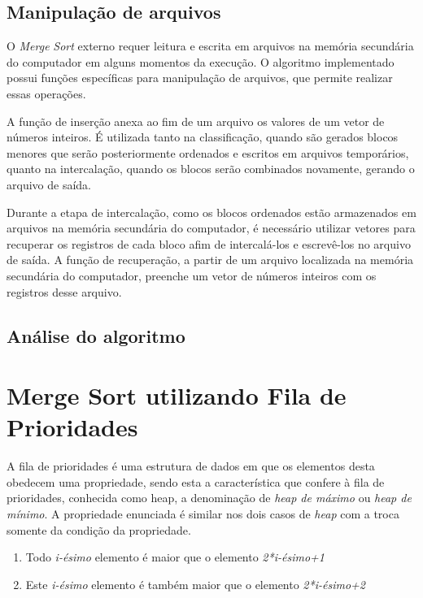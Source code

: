 \documentclass[a4paper, 12pt]{report}
\begin{document}
\chapter{Manipulação de arquivos}
\label{sec-2-2}

O \emph{Merge} \emph{Sort} externo requer leitura e escrita em arquivos na memória secundária
do computador em alguns momentos da execução.  O algoritmo implementado possui
funções específicas para manipulação de arquivos, que permite realizar essas
operações.

A função de inserção anexa ao fim de um arquivo os valores de um vetor de
números inteiros. É utilizada tanto na classificação, quando são gerados
blocos menores que serão posteriormente ordenados e escritos em arquivos
temporários, quanto na intercalação, quando os blocos serão combinados
novamente, gerando o arquivo de saída.

Durante a etapa de intercalação, como os blocos ordenados estão
armazenados em arquivos na memória secundária do computador, é necessário
utilizar vetores para recuperar os registros de cada bloco afim de
intercalá-los e escrevê-los no arquivo de saída. A função de recuperação,
a partir de um arquivo localizada na memória secundária  do computador,
preenche um vetor de números inteiros com os registros desse arquivo.

\chapter{Análise do algoritmo}
\label{sec-2-3}

\part{Merge Sort utilizando Fila de Prioridades}
\label{sec-3}

A fila de prioridades é uma estrutura de dados em que os elementos desta
obedecem uma propriedade, sendo esta a característica que confere à fila de
prioridades, conhecida como heap, a denominação de \emph{heap de máximo} ou \emph{heap
de mínimo}. A propriedade enunciada é similar nos dois casos de \emph{heap} com a
troca somente da condição da propriedade.

\begin{enumerate}
\item Todo \emph{i-ésimo} elemento é maior que o elemento \emph{2*i-ésimo+1}
\item Este \emph{i-ésimo} elemento é também maior que o elemento \emph{2*i-ésimo+2}
\end{enumerate}
\end{document}
